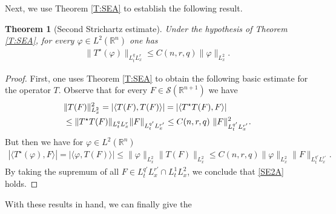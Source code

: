 \documentclass[11pt,letter]{amsart}
\def \R {\mathbb{R}}
\def \vf{\varphi}
\newcommand{\Rn}{\mathbb R^n}
\numberwithin{equation}{section}
\newtheorem{theorem}{Theorem}[section]
\numberwithin{equation}{section}
\begin{document}
Next, we use Theorem \ref{T:SEA} to establish the following result.
 
\begin{theorem}[Second Strichartz estimate]\label{T:SE2A}
Under the hypothesis of Theorem \ref{T:SEA}, for every $\vf\in L^2(\Rn)$ one has 
\begin{align}\label{SE2A}
\|T^{\star}(\vf)\|_{L^q_tL^r_x}\le C(n,r,q) \|\vf\|_{L^2_x}.
\end{align}
\end{theorem}

\begin{proof}
First, one uses Theorem \ref{T:SEA} to obtain the following basic estimate for the operator $T$. Observe that  for every $F\in \mathscr S(\R^{n+1})$ we have 
\begin{align}\label{TF}
& \|T(F)\|_{L^2_x}^{2}=|\langle T(F),T(F) \rangle|=|\langle T^{\star}T(F),F\rangle |
\\
& \le \|T^{\star}T(F)\|_{L^q_t L^r_x}\|F\|_{L^{q'}_t L^{r'}_x}\le C(n,r,q)\ \|F\|^{2}_{L^{q'}_t L^{r'}_x}.	
\notag
\end{align}
But then we have for $\vf\in L^2(\Rn)$
\begin{align*}
|\langle T^{\star}(\vf),F\rangle |=|\langle \vf, T(F) \rangle |\le \|\vf\|_{L^2_x} \|T(F)\|_{L^2_x}\le C(n,r,q) \|\vf\|_{L^2_x} \|F\|_{L^{q'}_t L^{r'}_x}.
\end{align*}
By taking the supremum of all $F\in L^{q'}_{t}L^{r'}_{x}\cap L^{1}_{t}L^{2}_{x}$, we conclude that \eqref{SE2A} holds.


\end{proof}

With these results in hand, we can finally give the 
\end{document}
